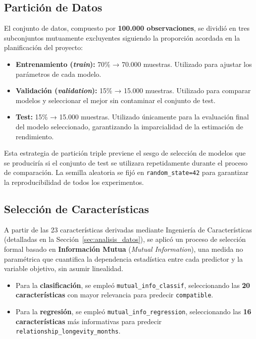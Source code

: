 \subsection{Partición de Datos}
\label{subsec:particion}

El conjunto de datos, compuesto por \textbf{100.000 observaciones}, se dividió en tres subconjuntos mutuamente excluyentes siguiendo la proporción acordada en la planificación del proyecto:

\begin{itemize}
    \item \textbf{Entrenamiento (\textit{train}):} 70\% → 70.000 muestras. Utilizado para ajustar los parámetros de cada modelo.
    \item \textbf{Validación (\textit{validation}):} 15\% → 15.000 muestras. Utilizado para comparar modelos y seleccionar el mejor sin contaminar el conjunto de test.
    \item \textbf{Test:} 15\% → 15.000 muestras. Utilizado únicamente para la evaluación final del modelo seleccionado, garantizando la imparcialidad de la estimación de rendimiento.
\end{itemize}

Esta estrategia de partición triple previene el sesgo de selección de modelos que se produciría si el conjunto de test se utilizara repetidamente durante el proceso de comparación. La semilla aleatoria se fijó en \texttt{random\_state=42} para garantizar la reproducibilidad de todos los experimentos.

\subsection{Selección de Características}
\label{subsec:seleccion_caracteristicas}

A partir de las 23 características derivadas mediante Ingeniería de Características (detalladas en la Sección~\ref{sec:analisis_datos}), se aplicó un proceso de selección formal basado en \textbf{Información Mutua} (\textit{Mutual Information}), una medida no paramétrica que cuantifica la dependencia estadística entre cada predictor y la variable objetivo, sin asumir linealidad.

\begin{itemize}
    \item Para la \textbf{clasificación}, se empleó \texttt{mutual\_info\_classif}, seleccionando las \textbf{20 características} con mayor relevancia para predecir \texttt{compatible}.
    \item Para la \textbf{regresión}, se empleó \texttt{mutual\_info\_regression}, seleccionando las \textbf{16 características} más informativas para predecir \texttt{relationship\_longevity\_months}.
\end{itemize}


